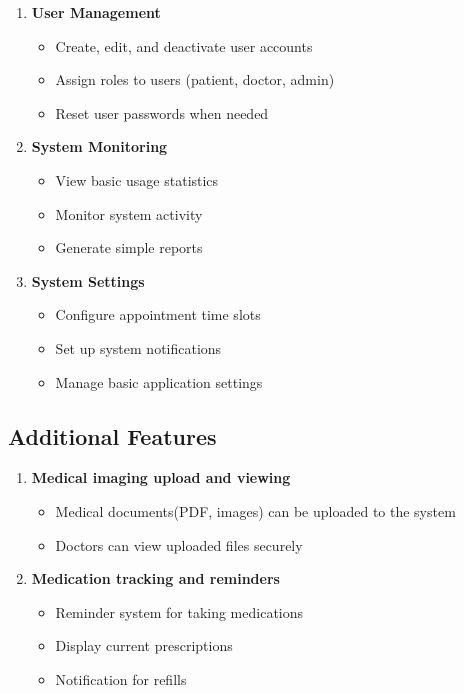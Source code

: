\documentclass[12pt,a4paper]{article}
\begin{document}
\begin{enumerate}
    \item 
\textbf{User Management}
\begin{itemize}[itemsep=0.1cm]
    \item Create, edit, and deactivate user accounts
    \item Assign roles to users (patient, doctor, admin)
    \item Reset user passwords when needed
\end{itemize}
    \item 
\textbf{System Monitoring}
\begin{itemize}[itemsep=0.1cm]
    \item View basic usage statistics
    \item Monitor system activity
    \item Generate simple reports
\end{itemize}
    \item 
\textbf{System Settings}
\begin{itemize}[itemsep=0.1cm]
    \item Configure appointment time slots
    \item Set up system notifications
    \item Manage basic application settings
\end{itemize}
\end{enumerate}







\subsection{Additional Features}
\begin{enumerate}
    \item 
\textbf{Medical imaging upload and viewing}
\begin{itemize}[itemsep=0.1cm]
    \item Medical documents(PDF, images) can be uploaded to the system
    \item Doctors can view uploaded files securely
\end{itemize}

    \item 
\textbf{Medication tracking and reminders}
\begin{itemize}[itemsep=0.1cm]
    \item Reminder system for taking medications
    \item Display current prescriptions
    \item Notification for refills
\end{itemize}
\end{enumerate}
\end{document}
